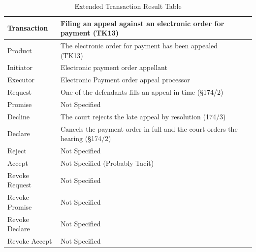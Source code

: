 \begin{landscape}
\begin{table}[h]
\caption{Extended Transaction Result Table}
\label{tab:etrt}
\begin{tabular}{|l||l|l|}
\hline
Transaction  &  Filing an appeal against an electronic order for payment (TK13) \\ \hline
Product      &  The electronic order for payment has been appealed (TK13) \\ \hline
Initiator      &  Electronic payment order appellant \\ \hline
Executor       & Electronic Payment order appeal processor \\ \hline
Request        & One of the defendants fills an appeal in time (\S174/2)
  \\ \hline
Promise        &    Not Specified   \\ \hline
Decline        & The court rejects the late appeal by resolution (174/3)  \\ \hline
Declare        &  Cancels the payment order in full and the court orders the hearing (\S174/2)  \\ \hline
Reject         &  Not Specified   \\ \hline
Accept         & Not Specified (Probably Tacit) \\ \hline
Revoke Request & Not Specified \\ \hline
Revoke Promise & Not Specified  \\ \hline
Revoke Declare & Not Specified      \\ \hline
Revoke Accept  &  Not Specified \\ \hline
\end{tabular}
\end{table}


\end{landscape}
